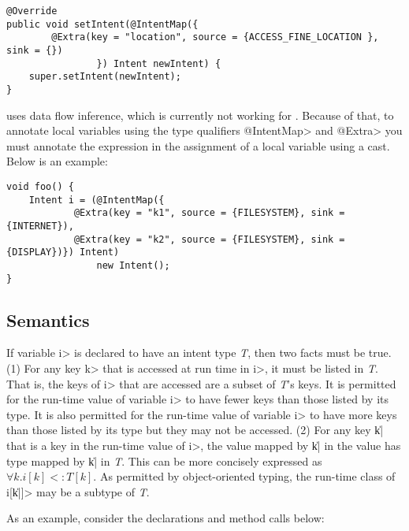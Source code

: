 \begin{Verbatim}
@Override
public void setIntent(@IntentMap({
        @Extra(key = "location", source = {ACCESS_FINE_LOCATION }, sink = {})
                }) Intent newIntent) {
    super.setIntent(newIntent);
}
\end{Verbatim}

\TheFlowChecker{} uses data flow inference, which is currently not working for
\theIntentChecker{}. Because of that, to annotate local variables using the type
qualifiers \<@IntentMap> and \<@Extra> you must annotate the expression in the
assignment of a local variable using a cast. Below is an example:

\begin{Verbatim}
void foo() {
    Intent i = (@IntentMap({
            @Extra(key = "k1", source = {FILESYSTEM}, sink = {INTERNET}),
            @Extra(key = "k2", source = {FILESYSTEM}, sink = {DISPLAY})}) Intent)
                new Intent();
}
\end{Verbatim}


\subsection{Semantics}
If variable \<i> is declared to have an intent type \textit{T}, then two facts must be
true. (1) For any key \<k> that is accessed at run time in \<i>, it must be
listed in \textit{T}. That is, the keys of \<i> that are accessed are
a subset of \textit{T}'s keys. It is
permitted for the run-time value of variable \<i> to have fewer keys than those
listed by its type. It is also permitted for the run-time value of variable
\<i> to have more keys than those listed by its type but they may not be
accessed. (2) For any key \|k| that is a key in the run-time value of \<i>,
the value mapped by \|k| in the value has type mapped by \|k| in \textit{T}. 
This can be more concisely expressed as $\forall k.i[k] <: T[k]$. As permitted
by object-oriented typing, the run-time class of \<i[\|k|]> may be a subtype of \textit{T}.

As an example, consider the declarations and method calls below:


